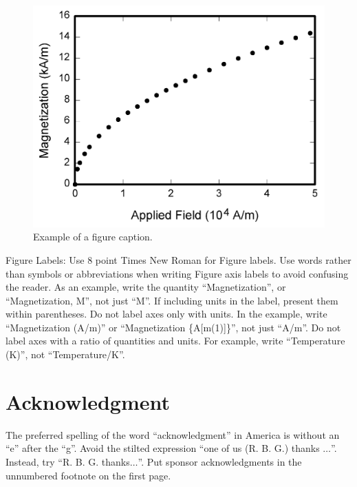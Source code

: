 \documentclass[conference]{IEEEtran}
\begin{document}
\begin{figure}[htbp]
\centerline{\includegraphics{fig1.png}}
\caption{Example of a figure caption.}
\label{fig}
\end{figure}

Figure Labels: Use 8 point Times New Roman for Figure labels. Use words 
rather than symbols or abbreviations when writing Figure axis labels to 
avoid confusing the reader. As an example, write the quantity 
``Magnetization'', or ``Magnetization, M'', not just ``M''. If including 
units in the label, present them within parentheses. Do not label axes only 
with units. In the example, write ``Magnetization (A/m)'' or ``Magnetization 
\{A[m(1)]\}'', not just ``A/m''. Do not label axes with a ratio of 
quantities and units. For example, write ``Temperature (K)'', not 
``Temperature/K''.

\section*{Acknowledgment}

The preferred spelling of the word ``acknowledgment'' in America is without 
an ``e'' after the ``g''. Avoid the stilted expression ``one of us (R. B. 
G.) thanks $\ldots$''. Instead, try ``R. B. G. thanks$\ldots$''. Put sponsor 
acknowledgments in the unnumbered footnote on the first page.
\end{document}
